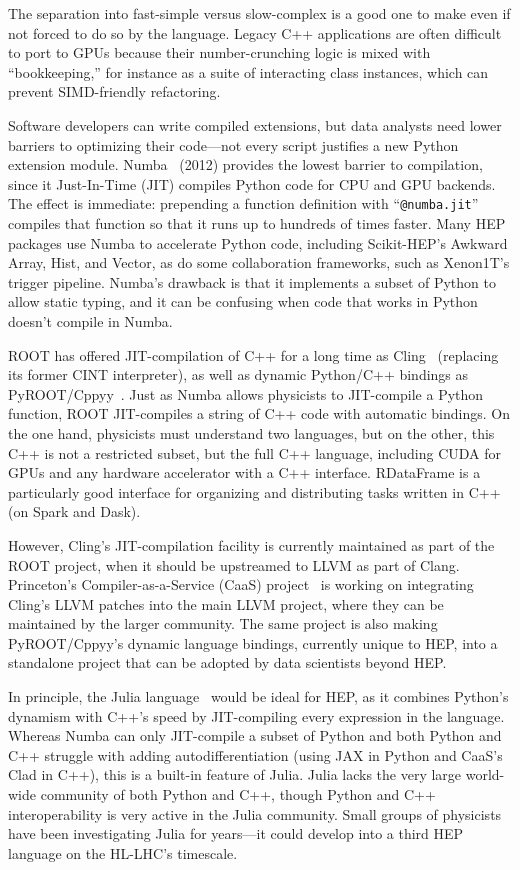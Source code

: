 \documentclass[12pt,a4paper]{article}
\begin{document}
The separation into fast-simple versus slow-complex is a good one to make even if not forced to do so by the language. Legacy C++ applications are often difficult to port to GPUs because their number-crunching logic is mixed with ``bookkeeping,'' for instance as a suite of interacting class instances, which can prevent SIMD-friendly refactoring.

Software developers can write compiled extensions, but data analysts need lower barriers to optimizing their code---not every script justifies a new Python extension module. Numba~\cite{lam2015numba} (2012) provides the lowest barrier to compilation, since it Just-In-Time (JIT) compiles Python code for CPU and GPU backends. The effect is immediate: prepending a function definition with ``{\tt @numba.jit}'' compiles that function so that it runs up to hundreds of times faster. Many HEP packages use Numba to accelerate Python code, including Scikit-HEP's Awkward Array, Hist, and Vector, as do some collaboration frameworks, such as Xenon1T's trigger pipeline. Numba's drawback is that it implements a subset of Python to allow static typing, and it can be confusing when code that works in Python doesn't compile in Numba.

ROOT has offered JIT-compilation of C++ for a long time as Cling~\cite{Vasilev_2012} (replacing its former CINT interpreter), as well as dynamic Python/C++ bindings as PyROOT/Cppyy~\cite{Lavrijsen:2015khc}. Just as Numba allows physicists to JIT-compile a Python function, ROOT JIT-compiles a string of C++ code with automatic bindings. On the one hand, physicists must understand two languages, but on the other, this C++ is not a restricted subset, but the full C++ language, including CUDA for GPUs and any hardware accelerator with a C++ interface. RDataFrame is a particularly good interface for organizing and distributing tasks written in C++ (on Spark and Dask).

However, Cling's JIT-compilation facility is currently maintained as part of the ROOT project, when it should be upstreamed to LLVM as part of Clang. Princeton's Compiler-as-a-Service (CaaS) project~\cite{compiler_research} is working on integrating Cling's LLVM patches into the main LLVM project, where they can be maintained by the larger community. The same project is also making PyROOT/Cppyy's dynamic language bindings, currently unique to HEP, into a standalone project that can be adopted by data scientists beyond HEP.

In principle, the Julia language~\cite{bezanson2017julia} would be ideal for HEP, as it combines Python's dynamism with C++'s speed by JIT-compiling every expression in the language. Whereas Numba can only JIT-compile a subset of Python and both Python and C++ struggle with adding autodifferentiation (using JAX in Python and CaaS's Clad in C++), this is a built-in feature of Julia. Julia lacks the very large world-wide community of both Python and C++, though Python and C++ interoperability is very active in the Julia community. Small groups of physicists have been investigating Julia for years---it could develop into a third HEP language on the HL-LHC's timescale.
\end{document}
